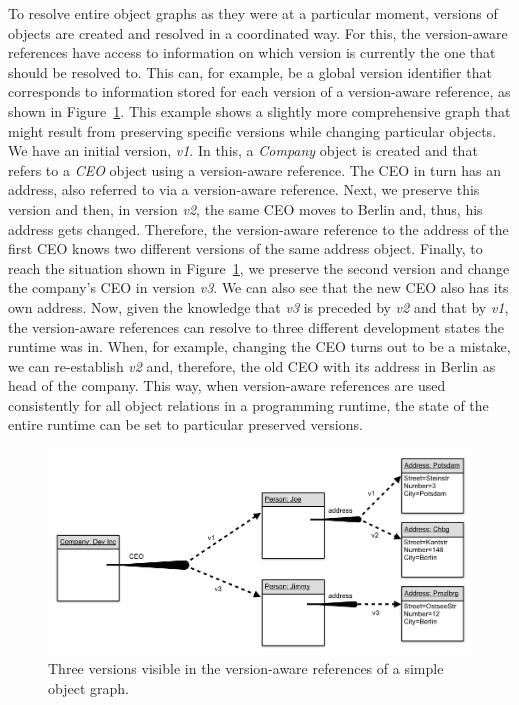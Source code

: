 To resolve entire object graphs as they were at a particular moment, versions of objects are created and resolved in a coordinated way.
For this, the version-aware references have access to information on which version is currently the one that should be resolved to.
This can, for example, be a global version identifier that corresponds to information stored for each version of a version-aware reference, as shown in Figure~\ref{fig:MoreVersionAwareReferences}.
This example shows a slightly more comprehensive graph that might result from preserving specific versions while changing particular objects.
We have an initial version, \emph{v1}.
In this, a \emph{Company} object is created and that refers to a \emph{CEO} object using a version-aware reference.
The CEO in turn has an address, also referred to via a version-aware reference.
Next, we preserve this version and then, in version \emph{v2}, the same CEO moves to Berlin and, thus, his address gets changed.
Therefore, the version-aware reference to the address of the first CEO knows two different versions of the same address object.
Finally, to reach the situation shown in Figure~\ref{fig:MoreVersionAwareReferences}, we preserve the second version and change the company's CEO in version \emph{v3}.
We can also see that the new CEO also has its own address.
Now, given the knowledge that \emph{v3} is preceded by \emph{v2} and that by \emph{v1}, the version-aware references can resolve to three different development states the runtime was in.
When, for example, changing the CEO turns out to be a mistake, we can re-establish \emph{v2} and, therefore, the old CEO with its address in Berlin as head of the company.
This way, when version-aware references are used consistently for all object relations in a programming runtime, the state of the entire runtime can be set to particular preserved versions.

\begin{figure}[h]
    \centering
    \includegraphics[width=\textwidth]{figures/MultipleVersionAwareReferences.png}
    \caption{Three versions visible in the version-aware references of a simple object graph.}
    \label{fig:MoreVersionAwareReferences}
\end{figure}

